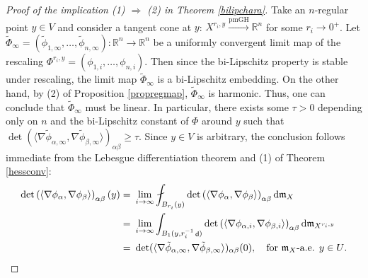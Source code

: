 \documentclass[11pt,reqno]{amsart}
\theoremstyle{definition}
\numberwithin{equation}{section}
\newcommand{\di}{\mathop{}\!\mathrm{d}}
\newcommand{\meas}{\mathfrak{m}}
\DeclareMathOperator{\dist}{\mathsf{d}}
\begin{document}
\begin{proof}[Proof of the implication   (1) $\Rightarrow$ (2) in Theorem \ref{bilipchara}]
Take an $n$-regular point $y \in V$ and consider a tangent cone at $y$: 
$
X^{r_i, y} \xrightarrow{\mathrm{pmGH}}  \mathbb{R}^n$ for some $r_i \to 0^+$.   
  Let $\widetilde \Phi_{\infty} =(\tilde \phi_{1, \infty}, \ldots, \tilde \phi_{n, \infty}):\mathbb{R}^n \to \mathbb{R}^n$ be a uniformly convergent limit map of the rescaling $\Phi^{r_i, y} = (\phi_{1, i}, \ldots, \phi_{n, i})$. Then since the bi-Lipschitz property is stable under rescaling, the limit map $\widetilde \Phi_{\infty}$ is a bi-Lipschitz embedding. On the other hand, by (2) of Proposition \ref{propregmap}, $\widetilde \Phi_{\infty}$ is harmonic. Thus, one can conclude that $\widetilde{\Phi}_{\infty}$ must be linear. In particular, there exists some $\tau  > 0$  depending only on $n$ and the bi-Lipschitz constant of $\Phi$ around $y$ such that
$
    \det(\langle \nabla \tilde \phi_{\alpha, \infty}, \nabla \tilde \phi_{\beta, \infty}\rangle)_{\alpha \beta} \ge \tau.$
Since $y\in V$ is arbitrary, the conclusion follows immediate from the Lebesgue differentiation theorem and (1) of Theorem \ref{hessconv}:
\begin{align*}\begin{split}
    \det\left(\langle \nabla \phi_{\alpha}, \nabla \phi_{\beta} \rangle\right)_{\alpha \beta} (y) = &\ \lim_{i \to \infty}\fint_{B_{r_i}(y)}\det \left(\langle \nabla \phi_{\alpha}, \nabla \phi_{\beta} \rangle\right)_{\alpha \beta} \di \meas_X \\
    = & \ \lim_{i \to \infty}\int_{B_1(y, r_i^{-1} \dist)}\det \left(\langle \nabla \phi_{\alpha, i}, \nabla \phi_{\beta, i} \rangle\right)_{\alpha \beta} \di \meas_{X^{r_i, y}}
    \\
    = & \ \det(\langle \nabla \tilde \phi_{\alpha, \infty}, \nabla \tilde \phi_{\beta , \infty} \rangle)_{\alpha \beta} (0), \quad \text{for $\meas_X$-a.e. $y \in U$.} \qedhere
\end{split}
\end{align*}
\end{proof}
\end{document}

